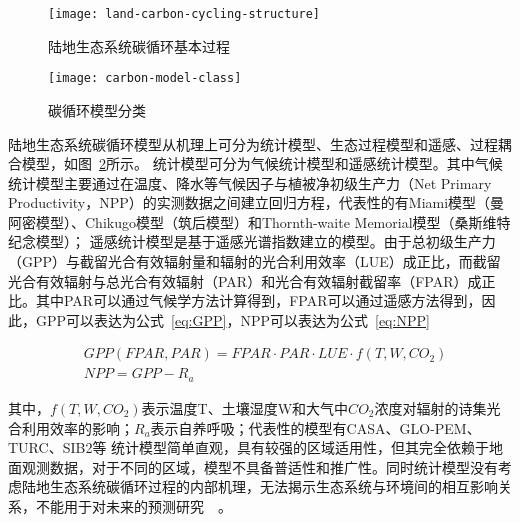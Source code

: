 \begin{figure}
    \centering
    \texttt{[image: land-carbon-cycling-structure]}
    \caption{陆地生态系统碳循环基本过程}
    \label{fig:land-carbon-cycling-structure}
\end{figure}

\begin{figure}
    \centering
    \texttt{[image: carbon-model-class]}
    \caption{碳循环模型分类}
    \label{fig:carbon-model-class}
\end{figure}

陆地生态系统碳循环模型从机理上可分为统计模型、生态过程模型和遥感、过程耦合模型，如图~\ref{fig:carbon-model-class}所示。
统计模型可分为气候统计模型和遥感统计模型。其中气候统计模型主要通过在温度、降水等气候因子与植被净初级生产力（Net Primary Productivity，NPP）的实测数据之间建立回归方程，代表性的有Miami模型（曼阿密模型）、Chikugo模型（筑后模型）和Thornth-waite Memorial模型（桑斯维特纪念模型）；
遥感统计模型是基于遥感光谱指数建立的模型。由于总初级生产力（GPP）与截留光合有效辐射量和辐射的光合利用效率（LUE）成正比，而截留光合有效辐射与总光合有效辐射（PAR）和光合有效辐射截留率（FPAR）成正比。其中PAR可以通过气候学方法计算得到，FPAR可以通过遥感方法得到，因此，GPP可以表达为公式~\ref{eq:GPP}，NPP可以表达为公式~\ref{eq:NPP}

\begin{align}
    &GPP(FPAR, PAR) = FPAR \cdot PAR \cdot LUE \cdot f(T, W, CO_2)
    \label{eq:GPP}  \\
    &NPP = GPP - R_a
    \label{eq:NPP}
\end{align}

其中，$f(T, W, CO_2)$表示温度T、土壤湿度W和大气中$CO_2$浓度对辐射的诗集光合利用效率的影响；$R_a$表示自养呼吸；代表性的模型有CASA、GLO-PEM、TURC、SIB2等
统计模型简单直观，具有较强的区域适用性，但其完全依赖于地面观测数据，对于不同的区域，模型不具备普适性和推广性。同时统计模型没有考虑陆地生态系统碳循环过程的内部机理，无法揭示生态系统与环境间的相互影响关系，不能用于对未来的预测研究~\cite{袁文平2014陆地生态系统植被生产力遥感模型研究进展}~\cite{谢馨瑶2018大尺度森林碳循环过程模拟模型综述}。

